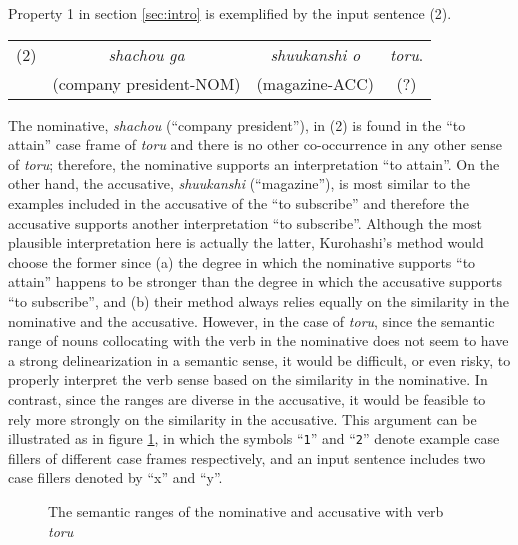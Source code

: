 Property 1 in section \ref{sec:intro} is exemplified by the input
sentence (2).
\begin{list}{}{\setlength{\leftmargin}{0mm}}
\item
  \begin{tabular}{cccc}
    (2) & {\it shachou\/} {\it ga\/} & {\it shuukanshi\/} {\it
      o\/} & {\it toru}. \\ & (company president-NOM) & (magazine-ACC)
    & (?)
  \end{tabular}
\end{list}
The nominative, {\it shachou\/} (``company president''), in (2) is
found in the ``to attain'' case frame of {\it toru\/} and there is no
other co-occurrence in any other sense of {\it toru\/}; therefore, the
nominative supports an interpretation ``to attain''.  On the other
hand, the accusative, {\it shuukanshi\/} (``magazine''), is most
similar to the examples included in the accusative of the ``to
subscribe'' and therefore the accusative supports another
interpretation ``to subscribe''. Although the most plausible
interpretation here is actually the latter, Kurohashi's method would
choose the former since (a) the degree in which the nominative
supports ``to attain'' happens to be stronger than the degree in which
the accusative supports ``to subscribe'', and (b) their method always
relies equally on the similarity in the nominative and the accusative.
However, in the case of {\it toru}, since the semantic range of nouns
collocating with the verb in the nominative does not seem to have a
strong delinearization in a semantic sense, it would be difficult, or
even risky, to properly interpret the verb sense based on the
similarity in the nominative. In contrast, since the ranges are
diverse in the accusative, it would be feasible to rely more strongly
on the similarity in the accusative.  This argument can be illustrated
as in figure \ref{fig:discussion}, in which the symbols ``{\tt 1}''
and ``{\tt 2}'' denote example case fillers of different case frames
respectively, and an input sentence includes two case fillers denoted
by ``x'' and ``y''.

\vspace{-4mm}
\begin{figure}[htbp]
  \begin{center}
    \leavevmode 
        
  \end{center}
 \vspace{-1mm}
  \caption{The semantic ranges of the nominative and accusative
    with verb {\it toru\/}}
  \label{fig:discussion}
\end{figure}

